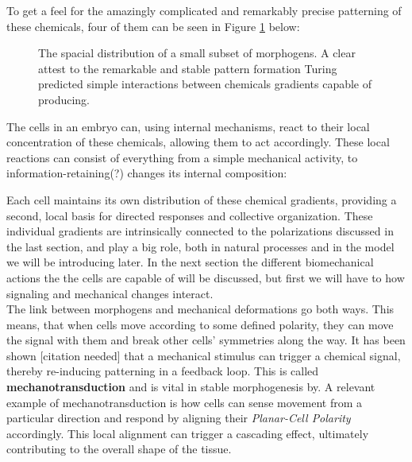To get a feel for the amazingly complicated and remarkably precise patterning of these chemicals, four of them can be seen in Figure \ref{fig:MorphogenMap} below:


\noindent

\begin{figure}[H]
    \centering
    \caption{The spacial distribution of a small subset of morphogens. A clear attest to the remarkable and stable pattern formation Turing predicted simple interactions between chemicals gradients capable of producing.}
    \label{fig:MorphogenMap}
\end{figure}

The cells in an embryo can, using internal mechanisms, react to their local concentration of these chemicals, allowing them to act accordingly. These local reactions can consist of everything from a simple mechanical activity, to information-retaining(?) changes its internal composition:

Each cell maintains its own distribution of these chemical gradients, providing a second, local basis for directed responses and collective organization. These individual gradients are intrinsically connected to the polarizations discussed in the last section, and play a big role, both in natural processes and in the model we will be introducing later. In the next section the different biomechanical actions the the cells are capable of will be discussed, but first we will have to how signaling and mechanical changes interact.\\

The link between morphogens and mechanical deformations go both ways. This means, that when cells move according to some defined polarity, they can move the signal with them and break other cells' symmetries along the way. It has been shown [citation needed] that a mechanical stimulus can trigger a chemical signal, thereby re-inducing patterning in a feedback loop. This is called \textbf{mechanotransduction} and is vital in stable morphogenesis\cite{bidhendi2019mechanical} by. A relevant example of mechanotransduction is how cells can sense movement from a particular direction and respond by aligning their \textit{Planar-Cell Polarity} accordingly.\cite{gray2011planar} This local alignment can trigger a cascading effect, ultimately contributing to the overall shape of the tissue.\\


